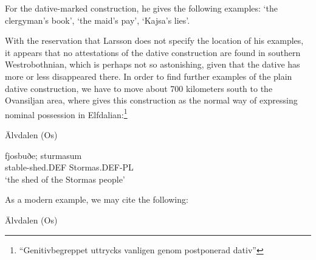 For the dative-marked construction, he gives the following examples:  ‘the clergyman’s book’,  ‘the maid’s pay’, ‘Kajsa’s lies’. 


With the reservation that Larsson does not specify the location of his examples, it appears that no attestations of the dative construction are found in southern Westrobothnian, which is perhaps not so astonishing, given that the dative has more or less disappeared there. In order to find further examples of the plain dative construction, we have to move about 700 kilometers south to the Ovansiljan area, where \citet[97]{Levander1909} gives this construction as the normal way of expressing nominal possession in Elfdalian:\footnote{ “Genitivbegreppet uttrycks vanligen genom postponerad dativ”}


\item 

Älvdalen (Os)



 \ea\label{}
\gll fjosbuðe;  sturmasum\\


stable-shed.DEF  Stormas.DEF-PL\\

\glt ‘the shed of the Stormas people’

\z

As a modern example, we may cite the following:


\item 

Älvdalen (Os)

